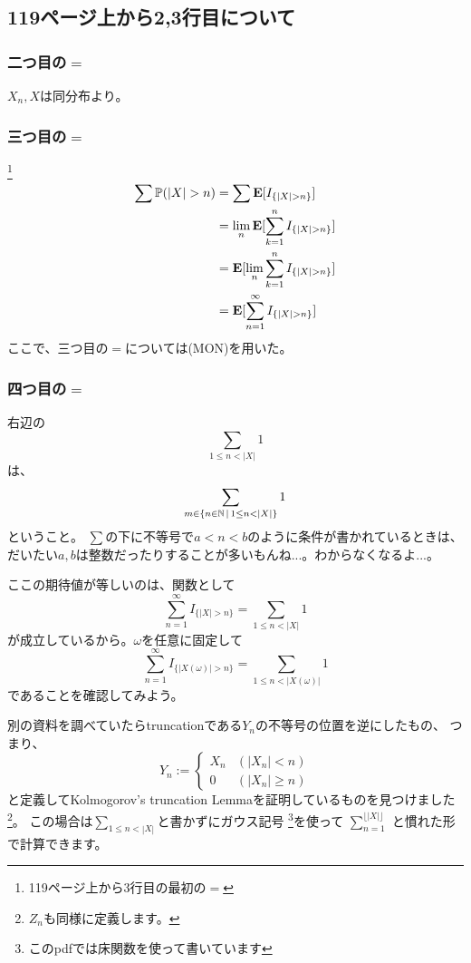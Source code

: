   \subsection{119ページ上から2,3行目について}
    \subsubsection{二つ目の$=$}
      $X_n,X$は同分布より。
    \subsubsection{三つ目の$=$}\footnote{119ページ上から3行目の最初の$=$}
      \begin{align*}
        \sum {\mathbb{P}}(|X| > n) &= \sum {\mathbf{E}}[I_{\{|X| > n\}}] \\
        &= \lim_n {\mathbf{E}}[\sum_{k =1}^n I_{\{|X| > n\}}] \\
        &= {\mathbf{E}}[\lim_n \sum_{k =1}^n I_{\{|X| > n\}}] \\
        &= {\mathbf{E}}[\sum_{n =1}^{\infty} I_{\{|X| > n\}}]
      \end{align*}
      ここで、三つ目の$=$については(MON)を用いた。
    \subsubsection{四つ目の$=$}
      右辺の
      \[
        \sum_{1 \leq n < |X|}1
      \]
      は、
      \[
        \sum_{m \in \{n \in {\mathbb{N}} \, \mid \, 1 \leq n < |X|\}}1
      \]
      ということ。
      $\sum$の下に不等号で$a<n<b$のように条件が書かれているときは、
      だいたい$a,b$は整数だったりすることが多いもんね...。わからなくなるよ...。

      ここの期待値が等しいのは、関数として
      \[
        \sum_{n =1}^{\infty} I_{\{|X| > n\}} = \sum_{1 \leq n < |X|}1
      \]
      が成立しているから。$\omega$を任意に固定して
      \[
        \sum_{n =1}^{\infty} I_{\{|X(\omega)| > n\}} = \sum_{1 \leq n < |X(\omega)|}1
      \]
      であることを確認してみよう。

      別の資料を調べていたらtruncationである$Y_n$の不等号の位置を逆にしたもの、
      つまり、
      \[
        Y_n := \begin{cases}
          X_n & (|X_n| < n)\\
          0 & (|X_n| \ge n)
      \end{cases}
      \]
      と定義してKolmogorov's truncation Lemmaを証明しているものを見つけました
      \footnote{$Z_n$も同様に定義します。}。
      この場合は$\displaystyle{\sum_{1 \leq n < |X|}}$と書かずにガウス記号
      \footnote{このpdfでは床関数を使って書いています}を使って
      $\displaystyle{\sum_{n = 1}^{\lfloor |X| \rfloor}}$
      と慣れた形で計算できます。
